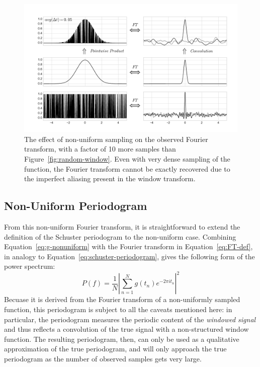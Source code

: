 \documentclass[preprint]{aastex}
\newcommand{\fig}[1]{Figure~\ref{fig:#1}}
\newcommand{\figlabel}[1]{\label{fig:#1}}
\newcommand{\Eq}[1]{Equation~\ref{eq:#1}}
\newcommand{\eq}[1]{\Eq{#1}}
\begin{document}
\begin{figure}[ht]
  \centering
  \includegraphics[width=\textwidth]{fig11_random_window_2}
  \caption{The effect of non-uniform sampling on the observed Fourier transform,
    with a factor of 10 more samples than \fig{random-window}.
    Even with very dense sampling of the function, the Fourier transform
    cannot be exactly recovered due to the imperfect aliasing present in
    the window transform.
    \figlabel{random-window-2}}
\end{figure}

\subsection{Non-Uniform Periodogram}

From this non-uniform Fourier transform, it is straightforward to extend the
definition of the Schuster periodogram to the non-uniform case.
Combining \eq{g-nonuniform} with the Fourier transform in \eq{FT-def}, in analogy to \eq{schuster-periodogram}, gives the following form of the power spectrum:
\begin{equation}
  P(f) = \frac{1}{N}\left|\sum_{n=1}^N g(t_n)e^{-2\pi i t_n} \right|^2
\end{equation}
Becuase it is derived from the Fourier transform of a non-uniformly sampled
function, this periodogram is subject to all the caveats mentioned here: in
particular, the periodogram measures the periodic content of the
{\it windowed signal} and thus reflects a convolution of the true signal
with a non-structured window function.
The resulting periodogram, then, can only be used as a qualitative approximation
of the true periodogram, and will only approach the true periodogram as the
number of observed samples gets very large.
\end{document}
